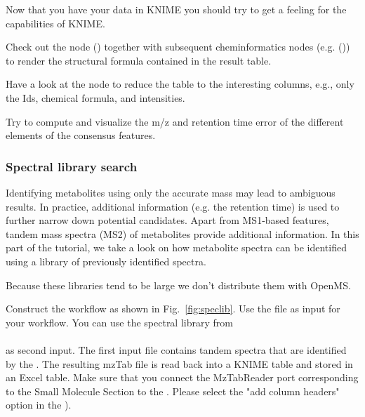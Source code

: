 Now that you have your data in KNIME you should try to get a feeling for the capabilities of KNIME.

\begin{task}
Check out the   node () together with subsequent cheminformatics nodes (e.g.  ()) to render the structural formula contained in the result table.

\end{task}
\begin{task}
Have a look at the  node to reduce the table to the interesting columns, e.g., only the Ids, chemical formula, and intensities.
\end{task}
\begin{task}
Try to compute and visualize the m/z and retention time error of the different elements of the consensus features.
\end{task}

\subsubsection{Spectral library search}

Identifying metabolites using only the accurate mass may lead to ambiguous results. In practice, additional information (e.g. the retention time) is used to further narrow down potential candidates. Apart from MS1-based features, tandem mass spectra (MS2) of metabolites provide additional information.
In this part of the tutorial, we take a look on how metabolite spectra can be identified using a library of previously identified spectra.

\noindent Because these libraries tend to be large we don't distribute them with OpenMS. 

\begin{task}
Construct the workflow as shown in Fig.~\ref{fig:speclib}.
Use the file  as input for your workflow.  You can use the spectral library from \\
\\ as second input. 
The first input file contains tandem spectra that are identified by the . The resulting mzTab file is read back into a KNIME table and stored in an Excel table. Make sure that you connect the MzTabReader port corresponding to the Small Molecule Section to the . Please select the "add column headers" option in the ).

\end{task}


